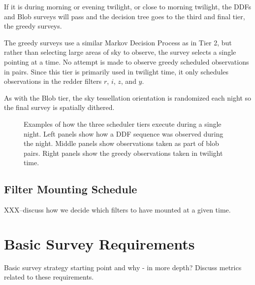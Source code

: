 If it is during morning or evening twilight, or close to morning twilight, the DDFs and Blob surveys will pass and the decision tree goes to the third and final tier, the greedy surveys. 

The greedy surveys use a similar Markov Decision Process as in Tier 2, but rather than selecting large areas of sky to observe, the survey selects a single pointing at a time.  No attempt is made to observe greedy scheduled observations in pairs.  Since this tier is primarily used in twilight time, it only schedules observations in the redder filters $r$, $i$, $z$, and $y$.  

As with the Blob tier, the sky tessellation orientation is randomized each night so the final survey is spatially dithered. 



\begin{figure}

\caption{Examples of how the three scheduler tiers execute during a single night. Left panels show how a DDF sequence was observed during the night. Middle panels show observations taken as part of blob pairs. Right panels show the greedy observations taken in twilight time.} \label{fig:examplenight}
\end{figure}

\subsection{Filter Mounting Schedule}

XXX--discuss how we decide which filters to have mounted at a given time.


\section{Basic Survey Requirements}
Basic survey strategy starting point and why - in more depth? Discuss metrics related to these requirements. 

